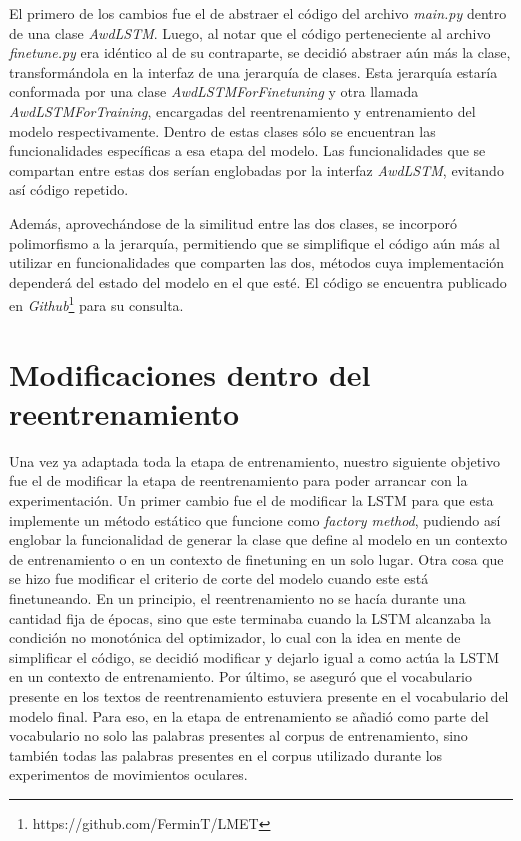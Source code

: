 El primero de los cambios fue el de abstraer el código del archivo \textit{main.py} dentro de una clase \textit{AwdLSTM}. Luego, al notar que el código perteneciente al archivo \textit{finetune.py} era idéntico al de su contraparte, se decidió abstraer aún más la clase, transformándola en la interfaz de una jerarquía de clases. Esta jerarquía estaría conformada por una clase \textit{AwdLSTMForFinetuning} y otra llamada \textit{AwdLSTMForTraining}, encargadas del reentrenamiento y entrenamiento del modelo respectivamente. Dentro de estas clases sólo se encuentran las funcionalidades específicas a esa etapa del modelo. Las funcionalidades que se compartan entre estas dos serían englobadas por la interfaz \textit{AwdLSTM}, evitando así código repetido.

Además, aprovechándose de la similitud entre las dos clases, se incorporó polimorfismo a la jerarquía, permitiendo que se simplifique el código aún más al utilizar en funcionalidades que comparten las dos, métodos cuya implementación dependerá del estado del modelo en el que esté. El código se encuentra publicado en \textit{Github}\footnote{https://github.com/FerminT/LMET} para su consulta.

\section{Modificaciones dentro del reentrenamiento}

Una vez ya adaptada toda la etapa de entrenamiento, nuestro siguiente objetivo fue el de modificar la etapa de reentrenamiento para poder arrancar con la experimentación. Un primer cambio fue el de modificar la LSTM para que esta implemente un método estático que funcione como \textit{factory method}, pudiendo así englobar la funcionalidad de generar la clase que define al modelo en un contexto de entrenamiento o en un contexto de finetuning en un solo lugar.
Otra cosa que se hizo fue modificar el criterio de corte del modelo cuando este está finetuneando. En un principio, el reentrenamiento no se hacía durante una cantidad fija de épocas, sino que este terminaba cuando la LSTM alcanzaba la condición no monotónica del optimizador, lo cual con la idea en mente de simplificar el código, se decidió modificar y dejarlo igual a como actúa la LSTM en un contexto de entrenamiento.
Por último, se aseguró que el vocabulario presente en los textos de reentrenamiento estuviera presente en el vocabulario del modelo final. Para eso, en la etapa de entrenamiento se añadió como parte del vocabulario no solo las palabras presentes al corpus de entrenamiento, sino también todas las palabras presentes en el corpus utilizado durante los experimentos de movimientos oculares.



